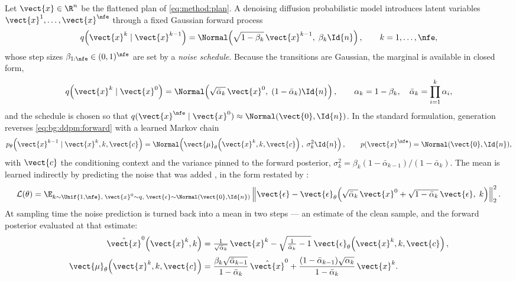 Let $\vect{x} \in \R^{n}$ be the flattened plan of \eqref{eq:method:plan}. A denoising diffusion probabilistic model
\parencite{sohl2015deep,ho2020denoising} introduces latent variables
$\vect{x}^{1},\dots,\vect{x}^{\nfe}$ through a fixed Gaussian forward process
\begin{equation}\label{eq:bg:ddpm:forward}
  q\!\left(\vect{x}^{k} \mid \vect{x}^{k-1}\right)
  = \Normal\!\left(\sqrt{1-\beta_{k}}\,\vect{x}^{k-1},\; \beta_{k}\Id{n}\right),
  \qquad k = 1,\dots,\nfe ,
\end{equation}
whose step sizes $\beta_{1:\nfe} \in (0,1)^{\nfe}$ are set by a \emph{noise schedule}. Because
the transitions are Gaussian, the marginal is available in closed form,
\begin{equation}\label{eq:bg:ddpm:marginal}
  q\!\left(\vect{x}^{k} \mid \vect{x}^{0}\right)
  = \Normal\!\left(\sqrt{\bar{\alpha}_{k}}\,\vect{x}^{0},\;(1-\bar{\alpha}_{k})\Id{n}\right),
  \qquad
  \alpha_{k} = 1-\beta_{k}, \quad \bar{\alpha}_{k} = \prod_{i=1}^{k}\alpha_{i},
\end{equation}
and the schedule is chosen so that $q(\vect{x}^{\nfe}\mid\vect{x}^{0}) \approx \Normal(\vect{0},\Id{n})$.
In the standard formulation, generation reverses \eqref{eq:bg:ddpm:forward} with a learned Markov chain
\begin{equation}\label{eq:bg:ddpm:reverse}
  p_{\theta}\!\left(\vect{x}^{k-1}\mid\vect{x}^{k},k,\vect{c}\right)
  = \Normal\!\left(\vect{\mu}_{\theta}\!\left(\vect{x}^{k},k,\vect{c}\right),\;\sigma_{k}^{2}\Id{n}\right),
  \qquad p(\vect{x}^{\nfe}) = \Normal(\vect{0},\Id{n}),
\end{equation}
with $\vect{c}$ the conditioning context and the variance pinned to the forward posterior,
$\sigma_{k}^{2} = \beta_{k}(1-\bar{\alpha}_{k-1})/(1-\bar{\alpha}_{k})$. The mean is learned
indirectly by predicting the noise that was added \parencite{ho2020denoising}, in the form
restated by \parencite[Sec.~4]{romer2025diffusion}:
\begin{equation}\label{eq:bg:ddpm:loss}
  \mathcal{L}(\theta)
  = \E_{k \sim \Unif\{1,\nfe\},\; \vect{x}^{0}\sim q,\; \vect{\epsilon}\sim\Normal(\vect{0},\Id{n})}
    \left\|\vect{\epsilon} - \vect{\epsilon}_{\theta}\!\left(
      \sqrt{\bar{\alpha}_{k}}\,\vect{x}^{0} + \sqrt{1-\bar{\alpha}_{k}}\,\vect{\epsilon},\;k\right)\right\|_{2}^{2}.
\end{equation}
At sampling time the noise prediction is turned back into a mean in two steps --- an estimate of
the clean sample, and the forward posterior evaluated at that estimate:
\begin{align}
  \hat{\vect{x}}^{0}\!\left(\vect{x}^{k},k\right)
    &= \tfrac{1}{\sqrt{\bar{\alpha}_{k}}}\,\vect{x}^{k}
       - \sqrt{\tfrac{1}{\bar{\alpha}_{k}}-1}\;\vect{\epsilon}_{\theta}\!\left(\vect{x}^{k},k,\vect{c}\right),
       \label{eq:bg:ddpm:x0} \\[2pt]
  \vect{\mu}_{\theta}\!\left(\vect{x}^{k},k,\vect{c}\right)
    &= \frac{\beta_{k}\sqrt{\bar{\alpha}_{k-1}}}{1-\bar{\alpha}_{k}}\,\hat{\vect{x}}^{0}
     + \frac{(1-\bar{\alpha}_{k-1})\sqrt{\alpha_{k}}}{1-\bar{\alpha}_{k}}\,\vect{x}^{k}.
       \label{eq:bg:ddpm:mean}
\end{align}

